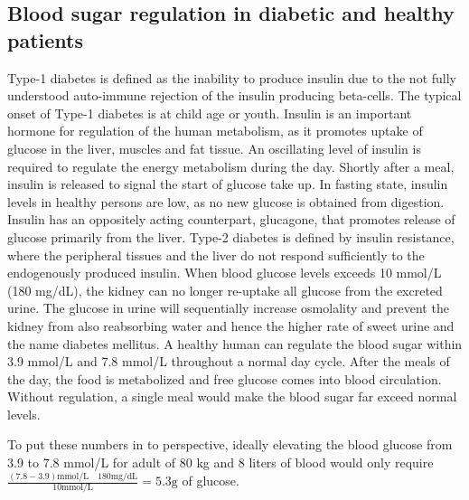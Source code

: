 \subsection{Blood sugar regulation in diabetic and healthy patients}
Type-1 diabetes  is defined as the inability to produce insulin due to the not fully understood auto-immune rejection of the insulin producing beta-cells. The typical onset of Type-1 diabetes is at child age or youth. Insulin is an important hormone for regulation of the human metabolism, as it promotes uptake of glucose in the liver, muscles and fat tissue. An oscillating level of insulin is required to regulate the energy metabolism during the day. Shortly after a meal, insulin is released to signal the start of glucose take up. In fasting state, insulin levels in healthy persons are low, as no new glucose is obtained from digestion. Insulin has an oppositely acting counterpart, glucagone, that promotes release of glucose primarily from the liver. Type-2 diabetes is defined by insulin resistance, where the peripheral tissues and the liver do not respond sufficiently to the endogenously produced insulin. When blood glucose levels exceeds 10 mmol/L (180 mg/dL), the kidney can no longer re-uptake all glucose from the excreted urine. The glucose in urine will sequentially increase osmolality and prevent the kidney from also reabsorbing water and hence the higher rate of sweet urine and the name diabetes mellitus. A healthy human can regulate the blood sugar within 3.9 mmol/L and 7.8 mmol/L throughout a normal day cycle. After the meals of the day, the food is metabolized and free glucose comes into blood circulation. Without regulation, a single meal would make the blood sugar far exceed normal levels\cite{silverthorn2010human,Cowart1990}.

To put these numbers in to perspective, ideally elevating the blood glucose from 3.9 to 7.8 mmol/L for adult of 80 kg and 8 liters of blood would only require
$ \frac { (7.8-3.9) \textrm{mmol/L} \quad 180\textrm{mg/dL} }
		{ 10 \textrm{mmol/L} } = 5.3 \textrm{g}$ of glucose.

